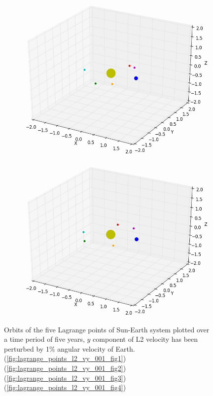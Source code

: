 \documentclass[10pt,letterpaper]{article}
\begin{document}
\begin{figure}[!htb]
  \includegraphics[width=\linewidth]{figures/lagrange_points/lagrange_points_l2_vy_001_3.png}
  \subcaption{}\label{fig:lagrange_points_l2_vy_001_fig3}
\endminipage
{}%
  \includegraphics[width=\linewidth]{figures/lagrange_points/lagrange_points_l2_vy_001_4.png}
  \subcaption{}\label{fig:lagrange_points_l2_vy_001_fig4}
\endminipage
\caption{Orbits of the five Lagrange points of Sun-Earth system plotted over a time period of five years, $y$ component of L2 velocity has been perturbed by 1$\%$ angular velocity of Earth.
(\ref{fig:lagrange_points_l2_vy_001_fig1}) 
(\ref{fig:lagrange_points_l2_vy_001_fig2}) 
(\ref{fig:lagrange_points_l2_vy_001_fig3}) 
(\ref{fig:lagrange_points_l2_vy_001_fig4})}\label{fig:lagrange_points_l2_vy_001}
\end{figure}
\end{document}
